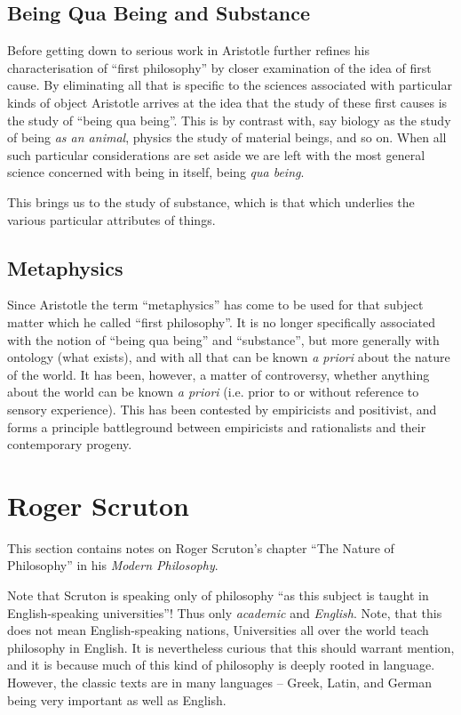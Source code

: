 \documentclass[10pt,titlepage]{article}
\begin{document}
\subsection{Being Qua Being and Substance}

Before getting down to serious work in Aristotle further refines his characterisation of ``first philosophy'' by closer examination of the idea of first cause.
By eliminating all that is specific to the sciences associated with particular kinds of object Aristotle arrives at the idea that the study of these first causes is the study of ``being qua being''.
This is by contrast with, say biology as the study of being \emph{as an animal}, physics the study of material beings, and so on.
When all such particular considerations are set aside we are left with the most general science concerned with being in itself, being \emph{qua being}.

This brings us to the study of substance, which is that which underlies the various particular attributes of things.

\subsection{Metaphysics}

Since Aristotle the term ``metaphysics'' has come to be used for that subject matter which he called ``first philosophy''.
It is no longer specifically associated with the notion of ``being qua being'' and ``substance'', but more generally with ontology (what exists), and with all that can be known \emph{a priori} about the nature of the world.
It has been, however, a matter of controversy, whether anything about the world can be known \emph{a priori} (i.e. prior to or without reference to sensory experience).
This has been contested by empiricists and positivist, and forms a principle battleground between empiricists and rationalists and their contemporary progeny.

\pagebreak
\section{Roger Scruton}\label{Scruton}

This section contains notes on Roger Scruton's chapter ``The Nature of Philosophy'' in his {\it Modern Philosophy}\cite{scruton97}.

Note that Scruton is speaking only of philosophy ``as this subject is taught in English-speaking universities''!
Thus only {\it academic} and {\it English}.
Note, that this does not mean English-speaking nations, Universities all over the world teach philosophy in English.
It is nevertheless curious that this should warrant mention, and it is because much of this kind of philosophy is deeply rooted in language.
However, the classic texts are in many languages -- Greek, Latin, and German being very important as well as English.
\end{document}
